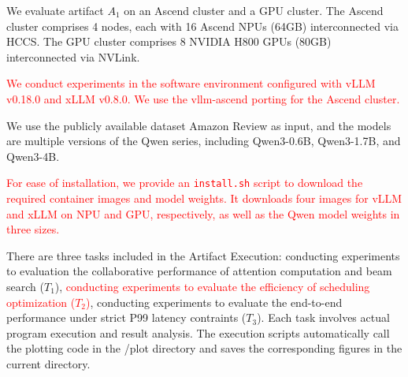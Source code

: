 \documentclass[nonacm,sigconf]{acmart}
\begin{document}
\artin


We evaluate artifact $A_1$ on an Ascend cluster and a GPU cluster. The Ascend cluster comprises 4 nodes, each with 16 Ascend NPUs (64GB) interconnected via HCCS. The GPU cluster comprises 8 NVIDIA H800 GPUs (80GB) interconnected via NVLink.



\textcolor{red}{We conduct experiments in the software environment configured with vLLM v0.18.0 and xLLM v0.8.0. We use the vllm-ascend porting for the Ascend cluster. }



We use the publicly available dataset Amazon Review as input, and the models are multiple versions of the Qwen series, including Qwen3-0.6B, Qwen3-1.7B, and Qwen3-4B.



\textcolor{red}{For ease of installation, we provide an \texttt{install.sh} script to download the required container images and model weights. It downloads four images for vLLM and xLLM on NPU and GPU, respectively, as well as the Qwen model weights in three sizes.}


\artcomp

There are three tasks included in the Artifact Execution: conducting experiments to evaluation the collaborative performance of attention computation and beam search ($T_1$), \textcolor{red}{conducting experiments to evaluate the efficiency of scheduling optimization ($T_2$)}, conducting experiments to evaluate the end-to-end performance under strict P99 latency contraints ($T_3$). Each task involves actual program execution and result analysis. The execution scripts automatically call the plotting code in the /plot directory and saves the corresponding figures in the current directory.
\end{document}
